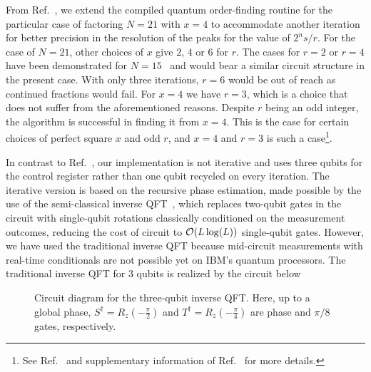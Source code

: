 \clearpage
\noindent
From Ref.~\cite{Lopez_2012}, we extend the compiled quantum order-finding routine for the particular case of factoring $N = 21$ with $x=4$ to accommodate another iteration for better precision in the resolution of the peaks for the value of $2^ns /r$. For the case of $N=21$, other choices of $x$ give $2$, $4$ or $6$ for $r$. The cases for $r=2$ or $r=4$ have been demonstrated for $N=15$~\cite{Vandersypen_2001, Lu_2007, Lanyon_2007, Politi_2009, Lucero_2012} and would bear a similar circuit structure in the present case. With only three iterations, $r=6$ would be out of reach as continued fractions would fail. For $x=4$ we have $r=3$, which is a choice that does not suffer from the aforementioned reasons. Despite $r$ being an odd integer, the algorithm is successful in finding it from $x=4$. This is the case for certain choices of perfect square $x$ and odd $r$, and $x=4$ and $r=3$ is such a case\footnote{See Ref.~\cite{Lawson_2015} and supplementary information of Ref.~\cite{Lopez_2012} for more details.}. 

\bigskip
\noindent
In contrast to Ref.~\cite{Lopez_2012}, our implementation is not iterative and uses three qubits for the control register rather than one qubit recycled on every iteration. The iterative version is based on the recursive phase estimation, made possible by the use of the semi-classical inverse \acs{QFT}~\cite{Griffiths_1996}, which replaces two-qubit gates in the circuit with single-qubit rotations classically conditioned on the measurement outcomes, reducing the cost of circuit to $\mathcal{O}(L\log(L))$ single-qubit gates. However, we have used the traditional inverse \acs{QFT} because mid-circuit measurements with real-time conditionals are not possible yet on IBM's quantum processors. The traditional inverse \acs{QFT} for $3$ qubits is realized by the circuit below~\cite{Mike&Ike}

\begin{figure}[h]
	\centering
	\caption[Circuit diagram for the three-qubit inverse \acs{QFT}]{Circuit diagram for the three-qubit inverse \acs{QFT}. Here, up to a global phase, ${S^{\dagger}= R_z(-\frac{\pi}{2})}$ and ${T^{\dagger} = R_z(-\frac{\pi}{4})}$ are phase and ${\pi/8}$ gates, respectively.}
\end{figure}


